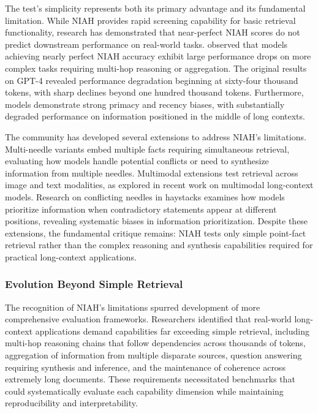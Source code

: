 The test's simplicity represents both its primary advantage and its fundamental limitation. While NIAH provides rapid screening capability for basic retrieval functionality, research has demonstrated that near-perfect NIAH scores do not predict downstream performance on real-world tasks. \citet{hsieh2024ruler} observed that models achieving nearly perfect NIAH accuracy exhibit large performance drops on more complex tasks requiring multi-hop reasoning or aggregation. The original results on GPT-4 revealed performance degradation beginning at sixty-four thousand tokens, with sharp declines beyond one hundred thousand tokens. Furthermore, models demonstrate strong primacy and recency biases, with substantially degraded performance on information positioned in the middle of long contexts.

The community has developed several extensions to address NIAH's limitations. Multi-needle variants embed multiple facts requiring simultaneous retrieval, evaluating how models handle potential conflicts or need to synthesize information from multiple needles. Multimodal extensions test retrieval across image and text modalities, as explored in recent work on multimodal long-context models. Research on conflicting needles in haystacks examines how models prioritize information when contradictory statements appear at different positions, revealing systematic biases in information prioritization. Despite these extensions, the fundamental critique remains: NIAH tests only simple point-fact retrieval rather than the complex reasoning and synthesis capabilities required for practical long-context applications.

\subsubsection{Evolution Beyond Simple Retrieval}

The recognition of NIAH's limitations spurred development of more comprehensive evaluation frameworks. Researchers identified that real-world long-context applications demand capabilities far exceeding simple retrieval, including multi-hop reasoning chains that follow dependencies across thousands of tokens, aggregation of information from multiple disparate sources, question answering requiring synthesis and inference, and the maintenance of coherence across extremely long documents. These requirements necessitated benchmarks that could systematically evaluate each capability dimension while maintaining reproducibility and interpretability.

